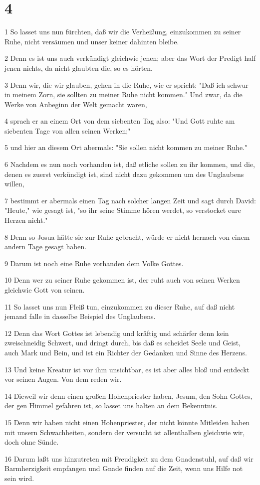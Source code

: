 \chapter{4}

\par 1 So lasset uns nun fürchten, daß wir die Verheißung, einzukommen zu seiner Ruhe, nicht versäumen und unser keiner dahinten bleibe.
\par 2 Denn es ist uns auch verkündigt gleichwie jenen; aber das Wort der Predigt half jenen nichts, da nicht glaubten die, so es hörten.
\par 3 Denn wir, die wir glauben, gehen in die Ruhe, wie er spricht: "Daß ich schwur in meinem Zorn, sie sollten zu meiner Ruhe nicht kommen." Und zwar, da die Werke von Anbeginn der Welt gemacht waren,
\par 4 sprach er an einem Ort von dem siebenten Tag also: "Und Gott ruhte am siebenten Tage von allen seinen Werken;"
\par 5 und hier an diesem Ort abermals: "Sie sollen nicht kommen zu meiner Ruhe."
\par 6 Nachdem es nun noch vorhanden ist, daß etliche sollen zu ihr kommen, und die, denen es zuerst verkündigt ist, sind nicht dazu gekommen um des Unglaubens willen,
\par 7 bestimmt er abermals einen Tag nach solcher langen Zeit und sagt durch David: "Heute," wie gesagt ist, "so ihr seine Stimme hören werdet, so verstocket eure Herzen nicht."
\par 8 Denn so Josua hätte sie zur Ruhe gebracht, würde er nicht hernach von einem andern Tage gesagt haben.
\par 9 Darum ist noch eine Ruhe vorhanden dem Volke Gottes.
\par 10 Denn wer zu seiner Ruhe gekommen ist, der ruht auch von seinen Werken gleichwie Gott von seinen.
\par 11 So lasset uns nun Fleiß tun, einzukommen zu dieser Ruhe, auf daß nicht jemand falle in dasselbe Beispiel des Unglaubens.
\par 12 Denn das Wort Gottes ist lebendig und kräftig und schärfer denn kein zweischneidig Schwert, und dringt durch, bis daß es scheidet Seele und Geist, auch Mark und Bein, und ist ein Richter der Gedanken und Sinne des Herzens.
\par 13 Und keine Kreatur ist vor ihm unsichtbar, es ist aber alles bloß und entdeckt vor seinen Augen. Von dem reden wir.
\par 14 Dieweil wir denn einen großen Hohenpriester haben, Jesum, den Sohn Gottes, der gen Himmel gefahren ist, so lasset uns halten an dem Bekenntnis.
\par 15 Denn wir haben nicht einen Hohenpriester, der nicht könnte Mitleiden haben mit unsern Schwachheiten, sondern der versucht ist allenthalben gleichwie wir, doch ohne Sünde.
\par 16 Darum laßt uns hinzutreten mit Freudigkeit zu dem Gnadenstuhl, auf daß wir Barmherzigkeit empfangen und Gnade finden auf die Zeit, wenn uns Hilfe not sein wird.

